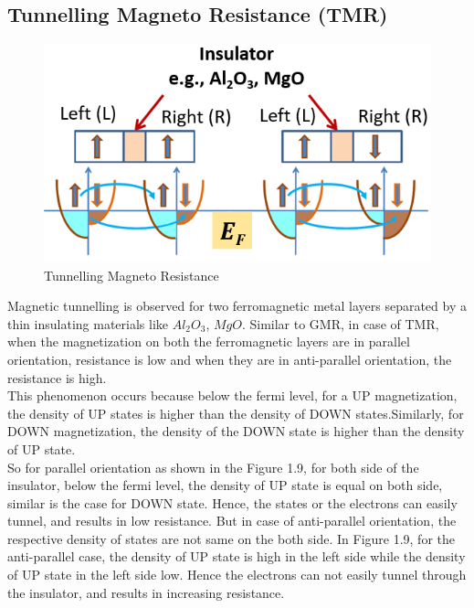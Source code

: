 \subsection{Tunnelling Magneto Resistance (TMR)}
\begin{figure}[H]
	\centering
   \includegraphics[scale=0.56]{Images/26.png} 
   \caption{Tunnelling Magneto Resistance}
\end{figure}
Magnetic tunnelling is observed for two ferromagnetic metal layers separated by a thin insulating materials like $Al_2O_3$, $MgO$. Similar to GMR, in case of TMR, when the magnetization on both the ferromagnetic layers are in parallel orientation, resistance is low and when they are in anti-parallel orientation, the resistance is high.\\
This phenomenon occurs because below the fermi level, for a UP magnetization, the density of UP states is higher than the density of DOWN states.Similarly, for DOWN magnetization, the density of the DOWN state is higher than the density of UP state.\\
So for parallel orientation as shown in the Figure 1.9, for both side of the insulator, below the fermi level, the density of UP state is equal on both side, similar is the case for DOWN state. Hence, the states or the electrons can easily tunnel, and results in low resistance. But in case of anti-parallel orientation, the respective density of states are not same on the both side. In Figure 1.9, for the anti-parallel case, the density of UP state is high in the left side while the density of UP state in the left side low. Hence the electrons can not easily tunnel through the insulator, and results in increasing resistance.   
